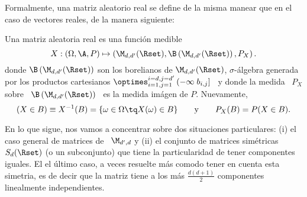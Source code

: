 Formalmente, una  matriz aleatorio real se define  de la misma manear  que en el
caso de vectores reales, de la manera siguiente:
%
\begin{definicion}
\label{Def:MP:MatrizAleatorioaReal}
%
  Una matriz aleatoria real es una funci\'on medible
  \[
  X:  (\Omega,\A,P) \mapsto  \left( \M_{d,d'}(\Rset)  ,  \B\left( \M_{d,d'}(\Rset)
    \right) , P_X \right).
  \]
  donde   $\B\left(    \M_{d,d'}(\Rset)   \right)$   son    los   borelianos   de
  $\M_{d,d'}(\Rset)$, $\sigma$-\'algebra  generada por los  productos cartesianos
  $\optimes_{i=1,j=1}^{i=d,j=d'}  \left( -\infty \;  b_{i,j} \right]$  \ y
  donde la  medida \ $P_X$  sobre \ $\B\left(  \M_{d,d'}(\Rset) \right)$ \  es la
  medida im\'agen de $P$. Nuevamente,
  \[
  (X \in  B) \equiv  X^{-1}(B) =  \{ \omega \in  \Omega \tq  X(\omega) \in  B \}
  \qquad \mbox{y} \qquad P_X(B) = P(X \in B).
  \]
\end{definicion}

En lo que sigue, nos vamos  a concentrar sobre dos situaciones particulares: (i)
el  caso general de  matrices de  \ $\M_{d',d}$  y (ii)  el conjunto  de matrices
sim\'etricas  $S_d(\Rset)$ (o  un subconjunto)  que tiene  la  particularidad de
tener componentes  iguales. El el \'ultimo  caso, a veces  resuelte m\'as comodo
tener en  cuenta esta  simetria, es  de decir que  la matriz  tiene a  los m\'as
$\frac{d (d+1)}{2}$ componentes linealmente independientes.





\label{Sssec:MP:MatricesAleatoriasGeneral}


